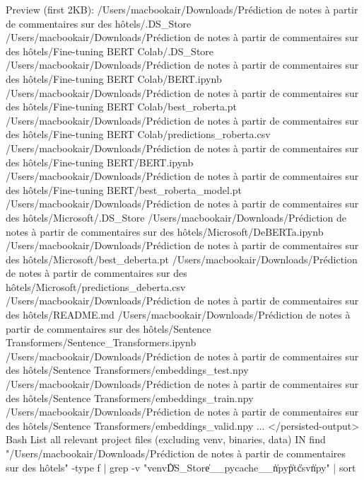 Preview (first 2KB):
/Users/macbookair/Downloads/Prédiction de notes à partir de commentaires sur des hôtels/.DS_Store
/Users/macbookair/Downloads/Prédiction de notes à partir de commentaires sur des hôtels/Fine-tuning BERT Colab/.DS_Store
/Users/macbookair/Downloads/Prédiction de notes à partir de commentaires sur des hôtels/Fine-tuning BERT Colab/BERT.ipynb
/Users/macbookair/Downloads/Prédiction de notes à partir de commentaires sur des hôtels/Fine-tuning BERT Colab/best_roberta.pt
/Users/macbookair/Downloads/Prédiction de notes à partir de commentaires sur des hôtels/Fine-tuning BERT Colab/predictions_roberta.csv
/Users/macbookair/Downloads/Prédiction de notes à partir de commentaires sur des hôtels/Fine-tuning BERT/BERT.ipynb
/Users/macbookair/Downloads/Prédiction de notes à partir de commentaires sur des hôtels/Fine-tuning BERT/best_roberta_model.pt
/Users/macbookair/Downloads/Prédiction de notes à partir de commentaires sur des hôtels/Microsoft/.DS_Store
/Users/macbookair/Downloads/Prédiction de notes à partir de commentaires sur des hôtels/Microsoft/DeBERTa.ipynb
/Users/macbookair/Downloads/Prédiction de notes à partir de commentaires sur des hôtels/Microsoft/best_deberta.pt
/Users/macbookair/Downloads/Prédiction de notes à partir de commentaires sur des hôtels/Microsoft/predictions_deberta.csv
/Users/macbookair/Downloads/Prédiction de notes à partir de commentaires sur des hôtels/README.md
/Users/macbookair/Downloads/Prédiction de notes à partir de commentaires sur des hôtels/Sentence Transformers/Sentence_Transformers.ipynb
/Users/macbookair/Downloads/Prédiction de notes à partir de commentaires sur des hôtels/Sentence Transformers/embeddings_test.npy
/Users/macbookair/Downloads/Prédiction de notes à partir de commentaires sur des hôtels/Sentence Transformers/embeddings_train.npy
/Users/macbookair/Downloads/Prédiction de notes à partir de commentaires sur des hôtels/Sentence Transformers/embeddings_valid.npy
...
</persisted-output>
Bash List all relevant project files (excluding venv, binaries, data)
IN
find "/Users/macbookair/Downloads/Prédiction de notes à partir de commentaires sur des hôtels" -type f | grep -v "venv\|\.DS_Store\|__pycache__\|\.npy\|\.pt\|\.csv\|\.npy" | sort

